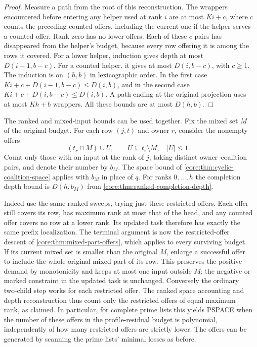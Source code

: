 \begin{proof}
Measure a path from the root of this reconstruction. The wrappers
encountered before entering any helper used at rank $i$ are at most
$Ki+c$, where $c$ counts the preceding counted offers, including the
current one if the helper serves a counted offer. Rank zero has no
lower offers. Each of these $c$ pairs has disappeared from the helper's
budget, because every row offering it is among the rows it covered.
For a lower helper, induction gives depth at most $D(i-1,b-c)$.
For a counted helper, it gives at most $D(i,b-c)$, with $c\ge1$.
The induction is on $(h,b)$ in lexicographic order. In the first case
$Ki+c+D(i-1,b-c)\le D(i,b)$, and in the second case
$Ki+c+D(i,b-c)\le D(i,b)$. A path ending at the original projection
uses at most $Kh+b$ wrappers. All these bounds are at most $D(h,b)$.
\end{proof}

The ranked and mixed-input bounds can be used together.
Fix the mixed set $M$ of the original budget. For each
row $(j,t)$ and owner $r$, consider the nonempty offers
\[
 (t_r\cap M)\cup U,\qquad U\subseteq t_r\setminus M,
 \quad |U|\le1.
\]
Count only those with an input at the rank of $j$, taking
distinct owner--coalition pairs, and denote their number
by $b_M$. The space bound of
\cref{core:thm:cyclic-coalition-space} applies with $b_M$
in place of $q$. For ranks $0,\ldots,h$ the completion
depth bound is $D(h,b_M)$ from
\cref{core:thm:ranked-completion-depth}.

Indeed use the same ranked sweeps, trying just these
restricted offers. Each offer still covers its row, has
maximum rank at most that of the head, and any counted
offer covers no row at a lower rank. Its updated task
therefore has exactly the same prefix localization.
The terminal argument is now the restricted-offer
descent of \cref{core:thm:mixed-part-offers}, which applies
to every surviving budget. If its current mixed set is
smaller than the original $M$, enlarge a successful
offer to include the whole original mixed part of its
row. This preserves the positive demand by monotonicity
and keeps at most one input outside $M$; the negative
or marked constraint in the updated task is unchanged.
Conversely the ordinary two-child step works for each
restricted offer. The ranked space accounting and
depth reconstruction thus count only the restricted
offers of equal maximum rank, as claimed. In particular,
for complete prime lists this yields PSPACE when the
number of these offers in the profile-residual budget is
polynomial, independently of how many restricted offers
are strictly lower. The offers can be generated by scanning
the prime lists' minimal losses as before.

